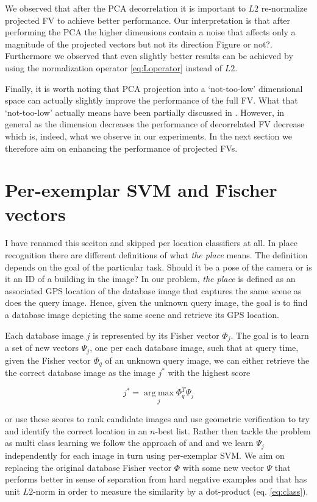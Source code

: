\documentclass[table]{article} %
\begin{document}
			We observed that after the PCA decorrelation it is important to $L2$ re-normalize projected FV to achieve better performance. Our interpretation is that after performing the PCA the higher dimensions contain a noise that affects only a magnitude of the projected vectors but not its direction \textcolor{myRed}{Figure or not?}. Furthermore we observed that even slightly better results can be achieved by using the normalization operator \eqref{eq:Loperator} instead of $L2$.

			Finally, it is worth noting that PCA projection into a `not-too-low' dimensional space can actually slightly improve the performance of the full FV. What that `not-too-low' actually means have been partially discussed in \cite{Jegou2012HAL}. However, in general as the dimension decreases the performance of decorrelated FV decrease which is, indeed, what we observe in our experiments. In the next section we therefore aim on enhancing the performance of projected FVs.   


\section{Per-exemplar SVM and Fischer vectors}
\textcolor{myRed}{I have renamed this seciton and skipped per location classifiers at all.}
\label{sec:perExemplar}
	In place recognition there are different definitions of what \emph{the place} means. The definition depends on the goal of the particular task. Should it be a pose of the camera or is it an ID of a building in the image? In our problem, \emph{the place} is defined as an associated GPS location of the database image that captures the same scene as does the query image. Hence, given the unknown query image, the goal is to find a database image depicting the same scene and retrieve its GPS location.

	Each database image $j$ is represented by its Fisher vector $\Phi_j$. The goal is to learn a set of new vectors $\Psi_j$, one per each database image, such that at query time, given the Fisher vector $\Phi_q$ of an unknown query image, we can either retrieve the the correct database image as the image $j^*$ with the highest score

	\begin{equation}
	   \label{eq:class}
	    j^*=\operatorname*{arg\;max}_{j} \Phi_q^T \Psi_j 
	\end{equation}

	or use these scores to rank candidate images and use geometric verification to try and identify the correct location in an $n$-best list. Rather then tackle the problem as multi class learning we follow the approach of \cite{Malisiewicz11} and \cite{Gronat2013} and we learn $\Psi_j$ independently for each image in turn using per-exemplar SVM. We aim on replacing the original database Fisher vector $\Phi$ with some new vector $\Psi$ that performs better in sense of separation from hard negative examples and that has unit $L2$-norm in order to measure the similarity by a dot-product (eq. \eqref{eq:class}).
\end{document}
